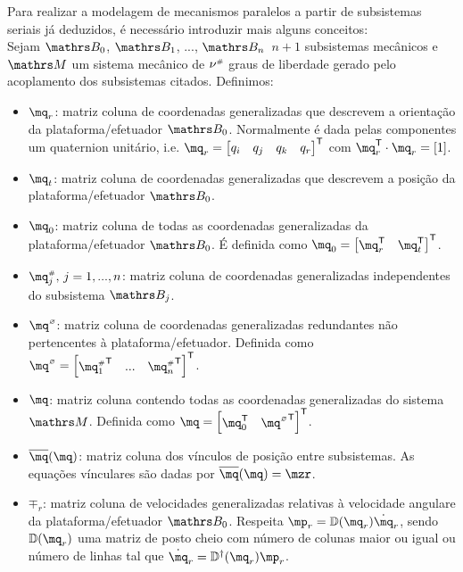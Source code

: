 \documentclass[a4paper,11pt,brazil,fleqn]{article}
\begin{document}
Para realizar a modelagem de mecanismos paralelos a partir de subsistemas seriais j\'a deduzidos, \'e necess\'ario introduzir mais alguns conceitos: \\

Sejam $\ssB_0$, $\ssB_1$, ..., $\ssB_{n} \,$ $n+1$ subsistemas mec\^anicos e $\ssM$ um sistema mec\^anico de $\nu^{\scriptscriptstyle \#}$ graus de liberdade gerado pelo acoplamento dos subsistemas citados. Definimos:

\begin{itemize}
\item $\mq_r$: matriz coluna de coordenadas generalizadas que descrevem a orienta\c{c}\~ao da plataforma/efetuador $\ssB_0$. Normalmente \'e dada pelas componentes um quaternion unit\'ario, i.e. $\mq_r = \begin{bmatrix} q_i & q_j & q_k & q_r \end{bmatrix}^\msT $ com $ \mq_r^\msT \cdot \mq_r = \vct{1}$.
\item $\mq_t$: matriz coluna de coordenadas generalizadas que descrevem a posi\c{c}\~ao da plataforma/efetuador $\ssB_0$.
\item $\mq_0$: matriz coluna de todas as coordenadas generalizadas da plataforma/efetuador $\ssB_0$. \'E definida como $\mq_0 = \begin{bmatrix} \mq_r^\msT & \mq_t^\msT \end{bmatrix}^\msT$.
\item $\mq_j\ssh, \,j=1, ..., n$: matriz coluna de coordenadas generalizadas independentes do subsistema  $\ssB_j$.
\item $\mq\hcir$: matriz coluna de coordenadas generalizadas redundantes n\~ao pertencentes \`a plataforma/efetuador. Definida como $\mq\hcir = \begin{bmatrix}  {\mq_1\ssh}^\msT & ... & {\mq_{n}\ssh}^\msT \end{bmatrix}^\msT $.
\item $\mq$: matriz coluna contendo todas as coordenadas generalizadas do sistema $\ssM$. Definida como $\mq = \begin{bmatrix} \mq_0^\msT & {\mq\hcir}^\msT \end{bmatrix}^\msT $.
\item $\overline{\mq}(\mq)$: matriz coluna dos v\'inculos de posi\c{c}\~ao entre subsistemas. As equa\c{c}\~oes v\'inculares s\~ao dadas por $\overline{\mq}(\mq) = \mzr $.
\item $\mp_r$: matriz coluna de velocidades generalizadas relativas \`a velocidade angulare da plataforma/efetuador $\ssB_0$. Respeita $\mp_r = \mD(\mq_r)\dot{\mq}_r$, sendo $\mD(\mq_r)$ uma matriz de posto cheio com n\'umero de colunas maior ou igual ou n\'umero de linhas tal que $\dot{\mq}_r  = \mD^\msP(\mq_r) \mp_r$.

\end{itemize}
\end{document}
